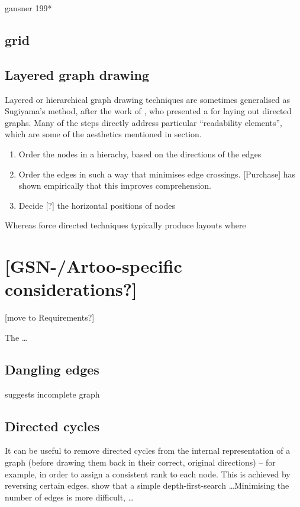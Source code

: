 gansner 199*

\subsection{grid}

\subsection{Layered graph drawing}

Layered or hierarchical graph drawing techniques are sometimes generalised as Sugiyama's method, after the work of \citet{4308636}, who presented a   for laying out directed graphs. Many of the steps directly address particular ``readability elements'', which are some of the aesthetics mentioned in section.

\begin{enumerate}
\item Order the nodes in a hierachy, based on the directions of the edges
\item Order the edges in such a way that minimises edge crossings. [Purchase] has shown empirically that this improves comprehension.
\item Decide [?] the horizontal positions of nodes
\end{enumerate}

Whereas force directed techniques typically produce layouts where 




\section{[GSN-/Artoo-specific considerations?]}

[move to Requirements?]

The  \ldots



\subsection{Dangling edges}

suggests incomplete graph

\subsection{Directed cycles}

It can be useful to remove directed cycles from the internal representation of a graph
(before drawing them back in their correct, original directions)
-- for example, in order to assign a consistent rank to each node.
This is achieved by reversing certain edges.
\citet{gansner1993} show that a simple depth-first-search \ldots  Minimising the number of edges is more difficult, \citeauthor{gansner1993} \ldots

